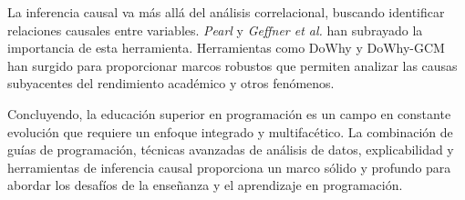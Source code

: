 La inferencia causal va más allá del análisis correlacional, buscando identificar relaciones causales entre variables. \textit{Pearl} \cite{pearl2009introduction} y \textit{Geffner et al.} \cite{geffner2022deep} han subrayado la importancia de esta herramienta. Herramientas como DoWhy \cite{sharma2020dowhy} y DoWhy-GCM \cite{blobaum2022dowhy} han surgido para proporcionar marcos robustos que permiten analizar las causas subyacentes del rendimiento académico y otros fenómenos.

Concluyendo, la educación superior en programación es un campo en constante evolución que requiere un enfoque integrado y multifacético. La combinación de guías de programación, técnicas avanzadas de análisis de datos, explicabilidad y herramientas de inferencia causal proporciona un marco sólido y profundo para abordar los desafíos de la enseñanza y el aprendizaje en programación.
